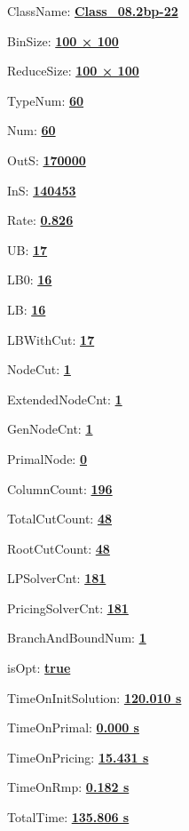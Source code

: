 \documentclass[11pt]{article}
\begin{document}
\pagestyle{empty}


ClassName: \underline{\textbf{Class_08.2bp-22}}
\par
BinSize: \underline{\textbf{100 × 100}}
\par
ReduceSize: \underline{\textbf{100 × 100}}
\par
TypeNum: \underline{\textbf{60}}
\par
Num: \underline{\textbf{60}}
\par
OutS: \underline{\textbf{170000}}
\par
InS: \underline{\textbf{140453}}
\par
Rate: \underline{\textbf{0.826}}
\par
UB: \underline{\textbf{17}}
\par
LB0: \underline{\textbf{16}}
\par
LB: \underline{\textbf{16}}
\par
LBWithCut: \underline{\textbf{17}}
\par
NodeCut: \underline{\textbf{1}}
\par
ExtendedNodeCnt: \underline{\textbf{1}}
\par
GenNodeCnt: \underline{\textbf{1}}
\par
PrimalNode: \underline{\textbf{0}}
\par
ColumnCount: \underline{\textbf{196}}
\par
TotalCutCount: \underline{\textbf{48}}
\par
RootCutCount: \underline{\textbf{48}}
\par
LPSolverCnt: \underline{\textbf{181}}
\par
PricingSolverCnt: \underline{\textbf{181}}
\par
BranchAndBoundNum: \underline{\textbf{1}}
\par
isOpt: \underline{\textbf{true}}
\par
TimeOnInitSolution: \underline{\textbf{120.010 s}}
\par
TimeOnPrimal: \underline{\textbf{0.000 s}}
\par
TimeOnPricing: \underline{\textbf{15.431 s}}
\par
TimeOnRmp: \underline{\textbf{0.182 s}}
\par
TotalTime: \underline{\textbf{135.806 s}}
\par
\newpage


\end{document}
